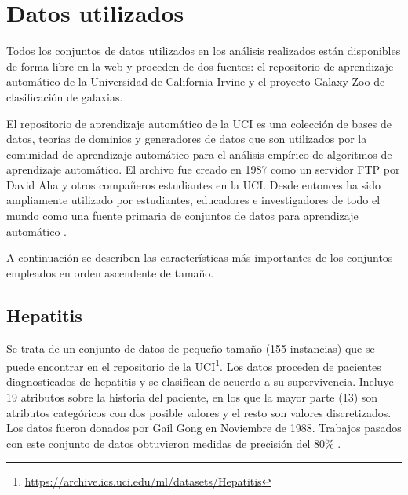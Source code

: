 \section{Datos utilizados}
\label{sec:datasets}


Todos los conjuntos de datos utilizados en los análisis realizados están disponibles de forma libre en la web y proceden de dos fuentes: el repositorio de aprendizaje automático de la Universidad de California Irvine y el proyecto Galaxy Zoo de clasificación de galaxias.

El repositorio de aprendizaje automático de la UCI es una colección de bases de datos, teorías de dominios y generadores de datos que son utilizados por la comunidad de aprendizaje automático para el análisis empírico de algoritmos de aprendizaje automático. El archivo fue creado en 1987 como un servidor FTP por David Aha y otros compañeros estudiantes en la UCI. Desde entonces ha sido ampliamente utilizado por estudiantes, educadores e investigadores de todo el mundo como una fuente primaria de conjuntos de datos para aprendizaje automático \cite{ml-uci}.

A continuación se describen las características más importantes de los conjuntos empleados en orden ascendente de tamaño.

\subsection{Hepatitis}

Se trata de un conjunto de datos de pequeño tamaño (155 instancias) que se puede encontrar en el repositorio de la UCI\footnote{\url{https://archive.ics.uci.edu/ml/datasets/Hepatitis}}. Los datos proceden de pacientes diagnosticados de hepatitis y se clasifican de acuerdo a su supervivencia. Incluye 19 atributos sobre la historia del paciente, en los que la mayor parte (13) son atributos categóricos con dos posible valores y el resto son valores discretizados. Los datos fueron donados por Gail Gong en Noviembre de 1988. Trabajos pasados con este conjunto de datos obtuvieron medidas de precisión del 80\% \cite{hepatitis-gong}.

